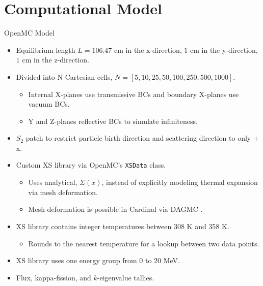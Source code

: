 \documentclass[9pt,t]{beamer}
\begin{document}
\section{Computational Model}
\begin{frame}{OpenMC Model}
    \pause
    \begin{itemize}
        \item <2-> Equilibrium length $L=106.47$ cm in the x-direction, $1$ cm in the y-direction, $1$ cm in the z-direction.
        \item <3-> Divided into N Cartesian cells, $N=[5, 10, 25, 50, 100, 250, 500, 1000]$.
        \begin{itemize}
            \item <4-> Internal X-planes use transmissive BCs and boundary X-planes use vacuum BCs.
            \item <5-> Y and Z-planes reflective BCs to simulate infiniteness.
        \end{itemize}
        \item <6-> $S_{2}$ patch to restrict particle birth direction and scattering direction to only $\pm$x.
        \item <7-> Custom XS library via OpenMC's \texttt{XSData} class.
        \begin{itemize}
            \item <8-> Uses analytical, $\Sigma(x)$, instead of explicitly modeling thermal expansion via mesh deformation.
            \item <9-> Mesh deformation is possible in Cardinal via DAGMC \cite{novak-2023}.
        \end{itemize}
        \item <10-> XS library contains integer temperatures between 308 K and 358 K.
        \begin{itemize}
            \item <11->Rounds to the nearest temperature for a lookup between two data points.
        \end{itemize}
        \item <12->XS library uses one energy group from $0$ to $20$ MeV.
        \item <13-> Flux, kappa-fission, and $k$-eigenvalue tallies.
    \end{itemize}
\end{frame}
\end{document}
